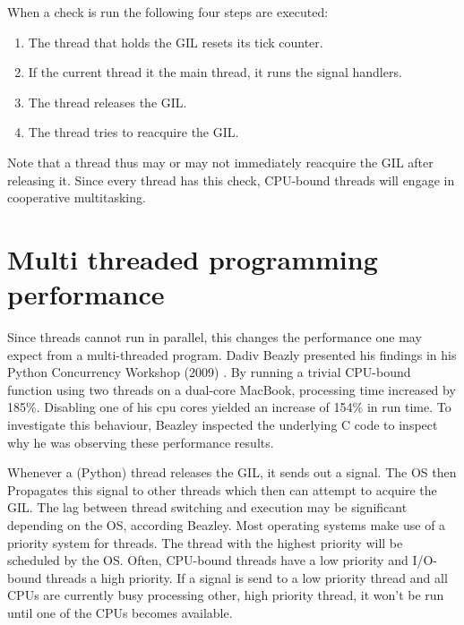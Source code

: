 

When a check is run the following four steps are executed:
\begin{enumerate}
	\item The thread that holds the GIL resets its tick counter.
	\item If the current thread it the main thread, it runs the signal handlers.
	\item The thread releases the GIL.
	\item The thread tries to reacquire the GIL.
\end{enumerate}

Note that a thread thus may or may not immediately reacquire the GIL after releasing it.
Since every thread has this check, CPU-bound threads will engage in cooperative multitasking.

\section{Multi threaded programming performance}
\label{sct:multi_theaded_programming_performance}

Since threads cannot run in parallel, this changes the performance one may expect from a multi-threaded program.
Dadiv Beazly presented his findings in his Python Concurrency Workshop (2009) \cite{beazley2009inside}.
By running a trivial CPU-bound function using two threads on a dual-core MacBook, processing time increased by 185\%.
Disabling one of his cpu cores yielded an increase of 154\% in run time.
To investigate this behaviour, Beazley inspected the underlying C code to inspect why he was observing these performance results.

Whenever a (Python) thread releases the GIL, it sends out a signal.
The OS then Propagates this signal to other threads which then can attempt to acquire the GIL.
The lag between thread switching and execution may be significant depending on the OS, according Beazley.
Most operating systems make use of a priority system for threads. 
The thread with the highest priority will be scheduled by the OS.
Often, CPU-bound threads have a low priority and I/O-bound threads a high priority.
If a signal is send to a low priority thread and all CPUs are currently busy processing other, high priority thread, it won't be run until one of the CPUs becomes available.


